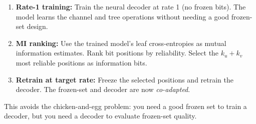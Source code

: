 \documentclass[11pt]{article}
\begin{document}
\begin{concept}[title=7. Three-Phase Design]
\begin{enumerate}[nosep]
  \item \textbf{Rate-1 training:} Train the neural decoder at rate 1 (no frozen bits). The model learns the channel and tree operations without needing a good frozen-set design.
  \item \textbf{MI ranking:} Use the trained model's leaf cross-entropies as mutual information estimates. Rank bit positions by reliability. Select the $k_u + k_v$ most reliable positions as information bits.
  \item \textbf{Retrain at target rate:} Freeze the selected positions and retrain the decoder. The frozen-set and decoder are now \emph{co-adapted}.
\end{enumerate}
This avoids the chicken-and-egg problem: you need a good frozen set to train a decoder, but you need a decoder to evaluate frozen-set quality.
\end{concept}
\end{document}
